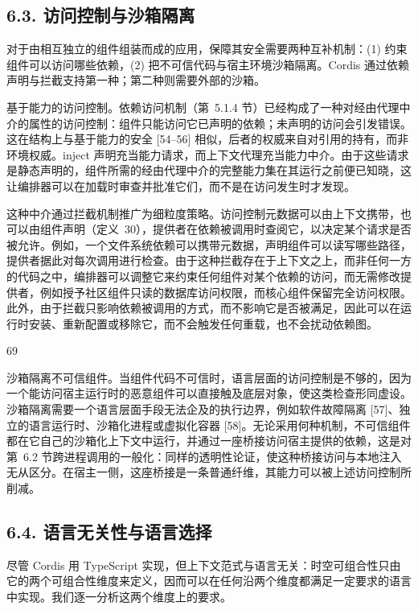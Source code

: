 \subsection{6.3. 访问控制与沙箱隔离}\label{access-control-and-sandboxing}

对于由相互独立的组件组装而成的应用，保障其安全需要两种互补机制：(1) 约束组件可以访问哪些依赖，(2) 把不可信代码与宿主环境沙箱隔离。Cordis 通过依赖声明与拦截支持第一种；第二种则需要外部的沙箱。

基于能力的访问控制。依赖访问机制（第~5.1.4 节）已经构成了一种对经由代理中介的属性的访问控制：组件只能访问它已声明的依赖；未声明的访问会引发错误。这在结构上与基于能力的安全 {[}54--56{]} 相似，后者的权威来自对引用的持有，而非环境权威。inject 声明充当能力请求，而上下文代理充当能力中介。由于这些请求是静态声明的，组件所需的经由代理中介的完整能力集在其运行之前便已知晓，这让编排器可以在加载时审查并批准它们，而不是在访问发生时才发现。

这种中介通过拦截机制推广为细粒度策略。访问控制元数据可以由上下文携带，也可以由组件声明（定义~30），提供者在依赖被调用时查阅它，以决定某个请求是否被允许。例如，一个文件系统依赖可以携带元数据，声明组件可以读写哪些路径，提供者据此对每次调用进行检查。由于这种拦截存在于上下文之上，而非任何一方的代码之中，编排器可以调整它来约束任何组件对某个依赖的访问，而无需修改提供者，例如授予社区组件只读的数据库访问权限，而核心组件保留完全访问权限。此外，由于拦截只影响依赖被调用的方式，而不影响它是否被满足，因此可以在运行时安装、重新配置或移除它，而不会触发任何重载，也不会扰动依赖图。

69

沙箱隔离不可信组件。当组件代码不可信时，语言层面的访问控制是不够的，因为一个能访问宿主运行时的恶意组件可以直接触及底层对象，使这类检查形同虚设。沙箱隔离需要一个语言层面手段无法企及的执行边界，例如软件故障隔离 {[}57{]}、独立的语言运行时、沙箱化进程或虚拟化容器 {[}58{]}。无论采用何种机制，不可信组件都在它自己的沙箱化上下文中运行，并通过一座桥接访问宿主提供的依赖，这是对第~6.2 节跨进程调用的一般化：同样的透明性论证，使这种桥接访问与本地注入无从区分。在宿主一侧，这座桥接是一条普通纤维，其能力可以被上述访问控制所削减。

\subsection{6.4. 语言无关性与语言选择}\label{language-independence-and-selection}

尽管 Cordis 用 TypeScript 实现，但上下文范式与语言无关：时空可组合性只由它的两个可组合性维度来定义，因而可以在任何沿两个维度都满足一定要求的语言中实现。我们逐一分析这两个维度上的要求。

